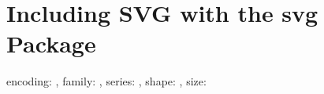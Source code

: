 \documentclass{article}
\makeatletter
\newcommand{\showfont}{encoding: \f@encoding{},
  family: \f@family{},
  series: \f@series{},
  shape: \f@shape{},
  size: \f@size{}
}
\makeatother
\begin{document}
\section{Including SVG with the svg Package}

\showfont

\begin{figure}[h]
  \centering
  \fbox{
  
  }
\end{figure}

% 
% 
\end{document}
